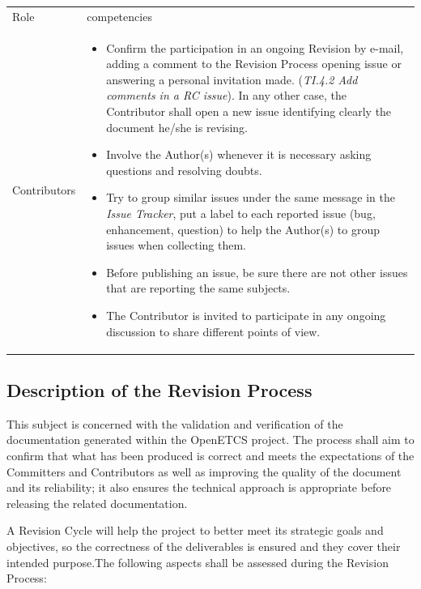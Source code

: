 \documentclass{template/openetcs_article}
\begin{document}
\begin{flushleft}
\begin{tabular}{|m{3cm}|m{11cm}|}
\hline
\rowcolor{myblue}
\multicolumn{2}{|c|}{Roles} \\\hline
\rowcolor{lightgray}
Role &
competencies 
\\\hline
Contributors &
\begin{itemize}
\item Confirm the participation in an ongoing Revision by e-mail, adding a comment to the Revision Process opening issue or answering a personal invitation made. ({\it TI.4.2 Add comments in a RC issue}). In any other case, the Contributor shall open a new issue identifying clearly the document he/she is revising. 
\item Involve the Author(s) whenever it is necessary asking questions and resolving doubts.
\item Try to group similar issues under the same message in the {\it Issue Tracker}, put a label to each reported issue (bug, enhancement, question) to help the Author(s) to group issues when collecting them.
\item Before publishing an issue, be sure there are not other issues that are reporting the same subjects.
\item The Contributor is invited to participate in any ongoing discussion to share different points of view.
\end{itemize}
\\\hline
\end{tabular}
\end{flushleft}


\subsection{Description of the Revision Process}

This subject is concerned with the validation and verification of the documentation generated within the OpenETCS project. The process shall aim to confirm that what has been produced is correct and meets the expectations of the Committers and Contributors as well as improving the quality of the document and its reliability; it also ensures the technical approach is appropriate before releasing the related documentation.

A Revision Cycle will help the project to better meet its strategic goals and objectives, so the correctness of the deliverables is ensured and they cover their intended purpose.The following aspects shall be assessed during the Revision Process:
\end{document}
